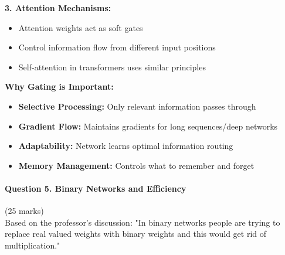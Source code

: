\documentclass[12pt]{article}
\begin{document}
\begin{enumerate}[(a)]
{    \textbf{3. Attention Mechanisms:}
    \begin{itemize}
        \item Attention weights act as soft gates
        \item Control information flow from different input positions
        \item Self-attention in transformers uses similar principles
    \end{itemize}
    
    \textbf{Why Gating is Important:}
    \begin{itemize}
        \item \textbf{Selective Processing:} Only relevant information passes through
        \item \textbf{Gradient Flow:} Maintains gradients for long sequences/deep networks
        \item \textbf{Adaptability:} Network learns optimal information routing
        \item \textbf{Memory Management:} Controls what to remember and forget
    \end{itemize}
    }
\end{enumerate}

\newpage
\paragraph{Question 5. Binary Networks and Efficiency}{\hfill (25 marks)}\\
Based on the professor's discussion: "In binary networks people are trying to replace real valued weights with binary weights and this would get rid of multiplication."
\end{document}

